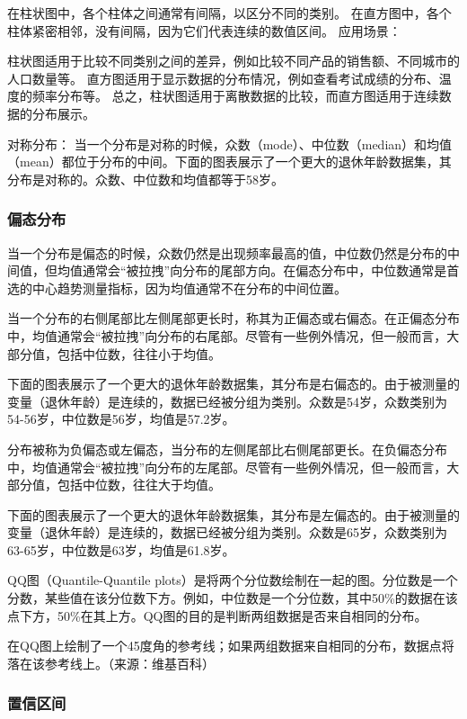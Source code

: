 \documentclass[]{book}
\begin{document}
在柱状图中，各个柱体之间通常有间隔，以区分不同的类别。
在直方图中，各个柱体紧密相邻，没有间隔，因为它们代表连续的数值区间。
应用场景：

柱状图适用于比较不同类别之间的差异，例如比较不同产品的销售额、不同城市的人口数量等。
直方图适用于显示数据的分布情况，例如查看考试成绩的分布、温度的频率分布等。
总之，柱状图适用于离散数据的比较，而直方图适用于连续数据的分布展示。

对称分布：
当一个分布是对称的时候，众数（mode）、中位数（median）和均值（mean）都位于分布的中间。下面的图表展示了一个更大的退休年龄数据集，其分布是对称的。众数、中位数和均值都等于58岁。

\hypertarget{ux504fux6001ux5206ux5e03}{%
\subsubsection{偏态分布}\label{ux504fux6001ux5206ux5e03}}

当一个分布是偏态的时候，众数仍然是出现频率最高的值，中位数仍然是分布的中间值，但均值通常会``被拉拽''向分布的尾部方向。在偏态分布中，中位数通常是首选的中心趋势测量指标，因为均值通常不在分布的中间位置。

当一个分布的右侧尾部比左侧尾部更长时，称其为正偏态或右偏态。在正偏态分布中，均值通常会``被拉拽''向分布的右尾部。尽管有一些例外情况，但一般而言，大部分值，包括中位数，往往小于均值。

下面的图表展示了一个更大的退休年龄数据集，其分布是右偏态的。由于被测量的变量（退休年龄）是连续的，数据已经被分组为类别。众数是54岁，众数类别为54-56岁，中位数是56岁，均值是57.2岁。

分布被称为负偏态或左偏态，当分布的左侧尾部比右侧尾部更长。在负偏态分布中，均值通常会``被拉拽''向分布的左尾部。尽管有一些例外情况，但一般而言，大部分值，包括中位数，往往大于均值。

下面的图表展示了一个更大的退休年龄数据集，其分布是左偏态的。由于被测量的变量（退休年龄）是连续的，数据已经被分组为类别。众数是65岁，众数类别为63-65岁，中位数是63岁，均值是61.8岁。

QQ图（Quantile-Quantile plots）是将两个分位数绘制在一起的图。分位数是一个分数，某些值在该分位数下方。例如，中位数是一个分位数，其中50\%的数据在该点下方，50\%在其上方。QQ图的目的是判断两组数据是否来自相同的分布。

在QQ图上绘制了一个45度角的参考线；如果两组数据来自相同的分布，数据点将落在该参考线上。（来源：维基百科）

\hypertarget{ux7f6eux4fe1ux533aux95f4}{%
\subsubsection{置信区间}\label{ux7f6eux4fe1ux533aux95f4}}
\end{document}
